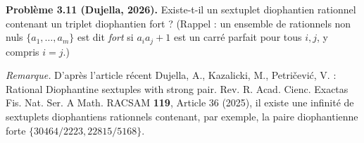 \textbf{Problème 3.11 (Dujella, 2026).} Existe-t-il un sextuplet diophantien rationnel contenant un triplet diophantien fort ? (Rappel : un ensemble de rationnels non nuls $\{a_1,\dots,a_m\}$ est dit \emph{fort} si $a_ia_j+1$ est un carré parfait pour tous $i,j$, y compris $i=j$.)

\medskip

\textit{Remarque.} D'après l'article récent Dujella, A., Kazalicki, M., Petričević, V. : Rational Diophantine sextuples with strong pair. Rev. R. Acad. Cienc. Exactas Fis. Nat. Ser. A Math. RACSAM \textbf{119}, Article 36 (2025), il existe une infinité de sextuplets diophantiens rationnels contenant, par exemple, la paire diophantienne forte $\{30464/2223, 22815/5168\}$.
